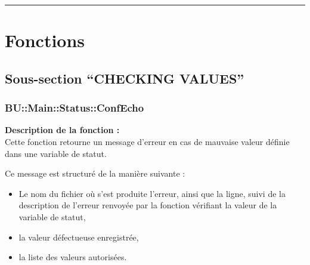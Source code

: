 \documentclass[a4paper,10pt]{article}
\begin{document}

\color{red}\par\noindent\rule{\textwidth}{0.4pt}\color{white}

\color{red}
\section{Fonctions}\color{white}

\color{green}
\subsection{Sous-section ``CHECKING VALUES''}

\color{blue}
\subsubsection{\color{mauve}BU::Main::Status::ConfEcho}\color{white}

\begin{justify}
\textbf{Description de la fonction :}\\
    Cette fonction retourne un message d'erreur en cas de mauvaise valeur définie dans une variable de statut.
\end{justify}

\begin{justify}
   	Ce message est structuré de la manière suivante :

   	\begin{itemize}
   		\item Le nom du fichier où s'est produite l'erreur, ainsi que la ligne, suivi de la description de l'erreur renvoyée par la fonction vérifiant la valeur de la variable de statut,\\

   		\item la valeur défectueuse enregistrée,\\

   		\item la liste des valeurs autorisées.
   	\end{itemize}
\end{justify}
\end{document}
